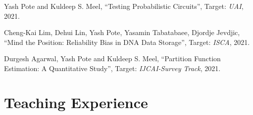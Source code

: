 \documentclass[12pt,letterpaper]{report}
\begin{document}
    \begin{tablist}

		\item[\the\year] \tab  Yash Pote  and Kuldeep S. Meel, \enquote{Testing Probabilistic Circuits}, Target: \textit{UAI},  2021.

		\item[\the\year] \tab  Cheng-Kai Lim, Dehui Lin, Yash Pote,  Yasamin Tabatabaee, Djordje Jevdjic, \enquote{Mind the Position: Reliability Bias in DNA Data
			Storage}, Target: \textit{ISCA},  2021.
		
		\item[\the\year] \tab  Durgesh Agarwal, Yash Pote  and Kuldeep S. Meel, \enquote{Partition Function Estimation: A Quantitative Study}, Target: \textit{IJCAI-Survey Track},  2021.
    \end{tablist}



%
%


%
%
%    	
%    	
%    
%





    \section*{Teaching Experience}
\end{document}
